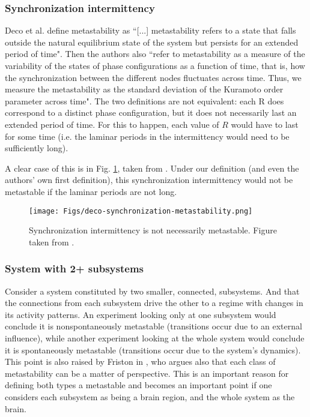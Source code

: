 \documentclass[preprint,superscriptaddress,showpacs,amsmath,amssymb,aps,pre,floatfix]{revtex4-1}
\theoremstyle{definition}
\begin{document}
\subsubsection{Synchronization intermittency}
\label{sec:studies-syncinter}
Deco et al. \cite{deco_2016, deco_2017} define metastability as ``[...] metastability refers to a state that falls outside the natural equilibrium state of the system but persists for an extended period of time". Then the authors also ``refer to metastability as a measure of the variability of the states of phase configurations as a function of time, that is, how the synchronization between the different nodes fluctuates across time. Thus, we measure the metastability as the standard deviation of the Kuramoto order parameter across time". 
The two definitions are not equivalent: each R does correspond to a distinct phase configuration, but it does not necessarily last an extended period of time. For this to happen, each value of $R$ would have to last for some time (i.e. the laminar periods in the intermittency would need to be sufficiently long).

A clear case of this is in Fig. \ref{fig:case-syncninter}, taken from \cite{deco_2017}.
Under our definition (and even the authors' own first definition), this synchronization intermittency would not be metastable if the laminar periods are not long. %
%
\begin{figure}[H]
    \centering
    \texttt{[image: Figs/deco-synchronization-metastability.png]}
    \caption{Synchronization intermittency is not necessarily metastable. Figure taken from \cite{deco_2017}.}
    \label{fig:case-syncninter}
\end{figure}


\subsubsection{System with 2+ subsystems}
\label{sec:studies-2systems}
Consider a system constituted by two smaller, connected, subsystems. And that the connections from each subsystem drive the other to a regime with changes in its activity patterns. An experiment looking only at one subsystem would conclude it is nonspontaneously metastable (transitions occur due to an external influence), while another experiment looking at the whole system would conclude it is spontaneously metastable (transitions occur due to the system's dynamics). This point is also raised by Friston in  \cite{friston_2000transients}, who argues also that each class of metastability can be a matter of perspective. This is an important reason for defining both types a metastable and becomes an important point if one considers each subsystem as being a brain region, and the whole system as the brain.
\end{document}
